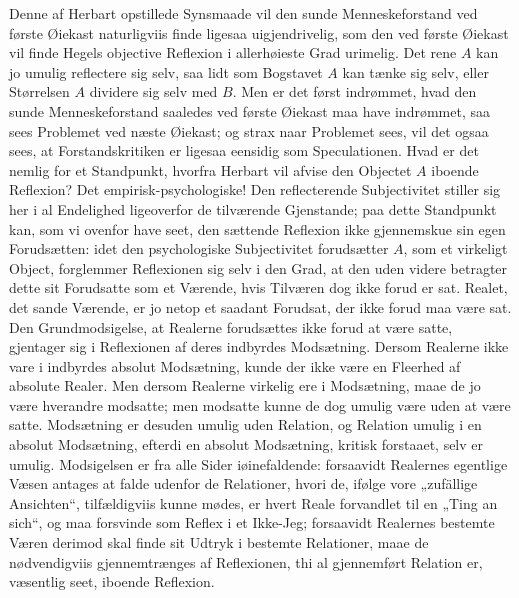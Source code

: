 \documentclass[11pt]{book}
\newcommand{\opage}[1]{\marginnote{\footnotesize\textit{[#1]}}}
\begin{document}
Denne af Herbart opstillede Synsmaade vil den sunde Menneskeforstand ved første Øiekast naturligviis finde ligesaa uigjendrivelig, som den ved første Øiekast vil finde Hegels objective Reflexion i allerhøieste Grad urimelig. Det rene $A$ kan jo umulig reflectere sig selv, saa lidt som Bogstavet $A$ kan tænke sig selv, eller Størrelsen $A$ dividere sig selv med $B$. Men er det først indrømmet, hvad den sunde Menneskeforstand saaledes ved første Øiekast maa have indrømmet, saa sees Problemet ved næste Øiekast; og strax naar Problemet sees, vil det ogsaa sees, at Forstandskritiken er ligesaa eensidig som Speculationen. Hvad er det nemlig for et Standpunkt, hvorfra Herbart vil afvise den Objectet $A$ iboende Reflexion? Det empirisk-psychologiske! Den reflecterende Subjectivitet stiller sig her i al Endelighed ligeoverfor de tilværende Gjenstande; paa dette Standpunkt kan, som vi ovenfor have seet, den sættende Reflexion ikke gjennemskue sin egen Forudsætten: idet den psychologiske Subjectivitet forudsætter $A$, som et virkeligt Object, forglemmer Reflexionen sig selv i den Grad, at den uden videre betragter dette sit Forudsatte som et Værende, hvis Tilværen dog ikke forud er sat. Realet, det sande Værende, er jo netop et saadant Forudsat, der ikke forud maa være sat. Den Grundmodsigelse, at Realerne forudsættes ikke forud at være satte, gjentager sig i Reflexionen af deres indbyrdes Modsætning. Dersom Realerne ikke vare i indbyrdes absolut Modsætning, kunde der ikke være en Fleerhed af absolute Realer. Men dersom Realerne virkelig ere i Modsætning, maae de jo være hverandre modsatte; men modsatte kunne de
\opage{73} \setcounter{footnote}{0}%
dog umulig være uden at være satte. Modsætning er desuden umulig uden Relation, og Relation umulig i en absolut Modsætning, efterdi en absolut Modsætning, kritisk forstaaet, selv er umulig. Modsigelsen er fra alle Sider iøinefaldende: forsaavidt Realernes egentlige Væsen antages at falde udenfor de Relationer, hvori de, ifølge vore „zufällige Ansichten“, tilfældigviis kunne mødes, er hvert Reale forvandlet til en
„Ting an sich“, og maa forsvinde som Reflex i et Ikke-Jeg; forsaavidt Realernes bestemte Væren derimod skal finde sit Udtryk i bestemte Relationer, maae de nødvendigviis gjennemtrænges af Reflexionen, thi al gjennemført Relation er, væsentlig seet, iboende Reflexion.
\end{document}
